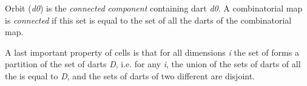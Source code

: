 Orbit \orbit{\betaun{},\myldots{},\betad{}}(\emph{d0}) is the \emph{connected
  component} containing dart \emph{d0}. A combinatorial map is
\emph{connected} if this set is equal to the set of all the darts
of the combinatorial map.

%

A last important property of cells is that for all dimensions \emph{i} the
set of  forms a partition of the set of darts \emph{D}, i.e.  for
any \emph{i}, the union of the sets of darts of all the  is equal
to \emph{D}, and the sets of darts of two different  are disjoint.

